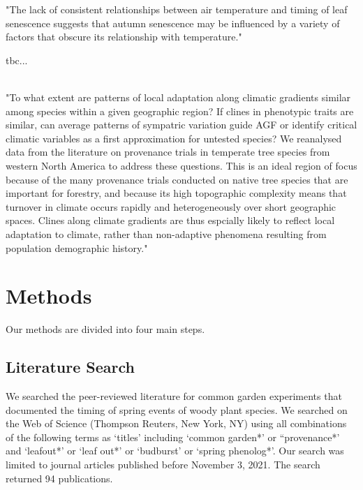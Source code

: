 \documentclass{article}
\begin{document}
"The lack of consistent relationships between air temperature and timing of leaf senescence suggests that autumn senescence may be influenced by a variety of factors that obscure its relationship with temperature."



tbc...

 
 

\citep{AitkenBemmels16}\\
"To what extent are patterns of local adaptation along climatic gradients similar among species within a given geographic region? If clines in phenotypic traits are similar, can average patterns of sympatric variation guide AGF or identify critical climatic variables as a first approximation for untested species? We reanalysed data from the literature on provenance trials in temperate tree species from western North America to address these questions. This is an ideal region of focus because of the many provenance trials conducted on native tree species that are important for forestry, and because its high topographic complexity means that turnover in climate occurs rapidly and heterogeneously over short geographic spaces. Clines along climate gradients are thus espcially likely to reflect local adaptation to climate, rather than non-adaptive phenomena resulting from population demographic history."
 




\section{Methods}
Our methods are divided into four main steps. 

\subsection{Literature Search}

We searched the peer-reviewed literature for common garden experiments that documented the timing of spring events of woody plant species. We searched on the Web of Science (Thompson Reuters, New York, NY) using all combinations of the following terms as ‘titles’ including ‘common garden*’ or “provenance*’ and ‘leafout*’ or ‘leaf out*’ or ‘budburst’ or ‘spring phenolog*’. Our search was limited to journal articles published before November 3, 2021. The search returned 94 publications. 
\\
\end{document}
